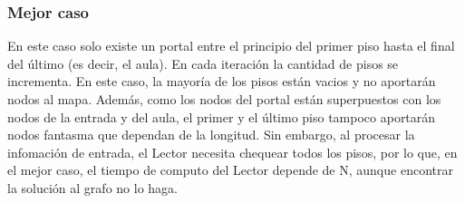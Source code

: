 \subsubsection{Mejor caso}
En este caso solo existe un portal entre el principio del primer piso hasta el final del último (es decir, el aula). En cada iteración la cantidad de pisos se incrementa. En este caso, la mayoría de los pisos están vacios y no aportarán nodos al mapa. Además, como los nodos del portal están superpuestos con los nodos de la entrada y del aula, el primer y el último piso tampoco aportarán nodos fantasma que dependan de la longitud. Sin embargo, al procesar la infomación de entrada, el Lector necesita chequear todos los pisos, por lo que, en el mejor caso, el tiempo de computo del Lector depende de N, aunque encontrar la solución al grafo no lo haga.

\newpage
